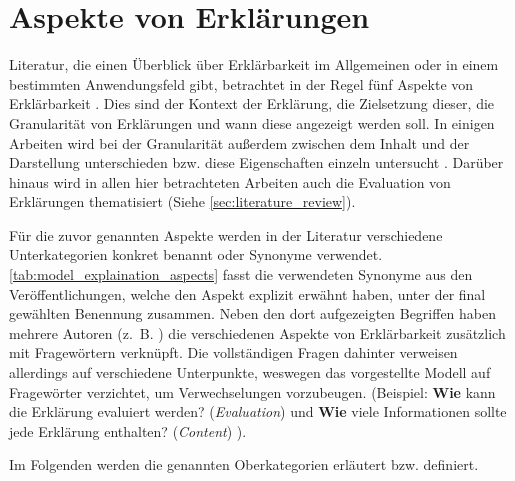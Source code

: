 \section{Aspekte von Erklärungen}
\label{sec:model_explanation_aspects}

Literatur, die einen Überblick über Erklärbarkeit im Allgemeinen oder in einem bestimmten Anwendungsfeld gibt, betrachtet in der Regel fünf Aspekte von Erklärbarkeit \cite{rosenfeld_explainability_2019, nunes_systematic_2017,chazette_knowledge_nodate}. Dies sind der Kontext der Erklärung, die Zielsetzung dieser, die Granularität von Erklärungen und wann diese angezeigt werden soll. In einigen Arbeiten wird bei der Granularität außerdem zwischen dem Inhalt und der Darstellung unterschieden bzw. diese Eigenschaften einzeln untersucht \cite{nunes_systematic_2017,abdulrahman_belief-based_2019}. Darüber hinaus wird in allen hier betrachteten Arbeiten auch die Evaluation von Erklärungen thematisiert (Siehe \autoref{sec:literature_review}).

Für die zuvor genannten Aspekte werden in der Literatur verschiedene Unterkategorien konkret benannt oder Synonyme verwendet. \autoref{tab:model_explaination_aspects} fasst die verwendeten Synonyme aus den Veröffentlichungen, welche den Aspekt explizit erwähnt haben, unter der final gewählten Benennung zusammen. Neben den dort aufgezeigten Begriffen haben mehrere Autoren (z.~B. \cite{rosenfeld_explainability_2019, chazette2020explainability}) die verschiedenen Aspekte von Erklärbarkeit zusätzlich mit Fragewörtern verknüpft. Die vollständigen Fragen dahinter verweisen allerdings auf verschiedene Unterpunkte, weswegen das vorgestellte Modell auf Fragewörter verzichtet, um Verwechselungen vorzubeugen. (Beispiel: \glqq \textbf{Wie} kann die Erklärung evaluiert werden?\grqq{} (\textit{Evaluation}) \cite[vgl.][]{rosenfeld_explainability_2019} und \glqq \textbf{Wie} viele Informationen sollte jede Erklärung enthalten?\grqq{} (\textit{Content}) \cite[vgl.][]{kouki_user_2017}).

\bigskip

Im Folgenden werden die genannten Oberkategorien erläutert bzw. definiert.

